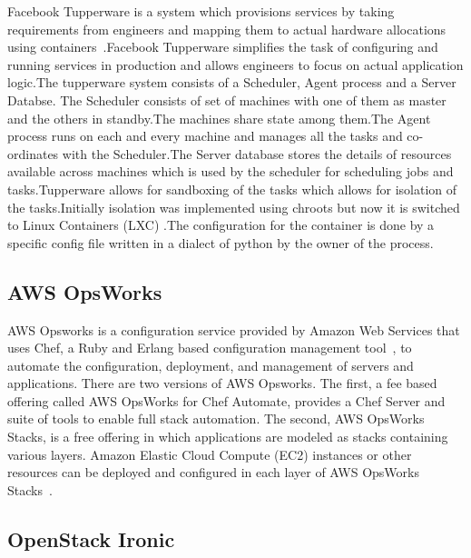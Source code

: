 {Facebook Tupperware is a system which provisions services by taking
requirements from engineers and mapping them to actual hardware
allocations using containers~\cite{www-FaceTup}.Facebook Tupperware
simplifies the task of configuring and running services in production
and allows engineers to focus on actual application logic.The
tupperware system consists of a Scheduler, Agent process and a Server
Databse.  The Scheduler consists of set of machines with one of them
as master and the others in standby.The machines share state among
them.The Agent process runs on each and every machine and manages all
the tasks and co-ordinates with the Scheduler.The Server database
stores the details of resources available across machines which is
used by the scheduler for scheduling jobs and tasks.Tupperware allows
for sandboxing of the tasks which allows for isolation of the
tasks.Initially isolation was implemented using chroots but now it is
switched to Linux Containers (LXC) .The configuration for the
container is done by a specific config file written in a dialect of
python by the owner of the process.

\subsection{AWS OpsWorks}

AWS Opsworks is a configuration service provided by Amazon Web
Services that uses Chef, a Ruby and Erlang based configuration
management tool~\cite{www-wikichef}, to automate the configuration,
deployment, and management of servers and applications. There are two
versions of AWS Opsworks.  The first, a fee based offering called AWS
OpsWorks for Chef Automate, provides a Chef Server and suite of tools
to enable full stack automation. The second, AWS OpsWorks Stacks, is a
free offering in which applications are modeled as stacks containing
various layers. Amazon Elastic Cloud Compute (EC2) instances or other
resources can be deployed and configured in each layer of AWS OpsWorks
Stacks~\cite{www-awsopsworks}.

\subsection{OpenStack Ironic}

}

